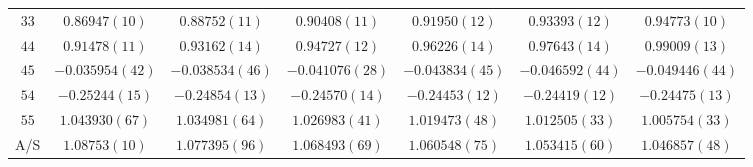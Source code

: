 \begin{table}
\begin{center}
\begin{tabular}{c|c c c c c c}
$33$ & $0.86947(10)$ & $0.88752(11)$ & $0.90408(11)$ & $0.91950(12)$ & $0.93393(12)$ & $0.94773(10)$ \\
$44$ & $0.91478(11)$ & $0.93162(14)$ & $0.94727(12)$ & $0.96226(14)$ & $0.97643(14)$ & $0.99009(13)$ \\
$45$ & $-0.035954(42)$ & $-0.038534(46)$ & $-0.041076(28)$ & $-0.043834(45)$ & $-0.046592(44)$ & $-0.049446(44)$ \\
$54$ & $-0.25244(15)$ & $-0.24854(13)$ & $-0.24570(14)$ & $-0.24453(12)$ & $-0.24419(12)$ & $-0.24475(13)$ \\
$55$ & $1.043930(67)$ & $1.034981(64)$ & $1.026983(41)$ & $1.019473(48)$ & $1.012505(33)$ & $1.005754(33)$ \\
\hline
A/S & $1.08753(10)$ & $1.077395(96)$ & $1.068493(69)$ & $1.060548(75)$ & $1.053415(60)$ & $1.046857(48)$ \\
\hline
\hline
\end{tabular}
\end{center}
\end{table}
